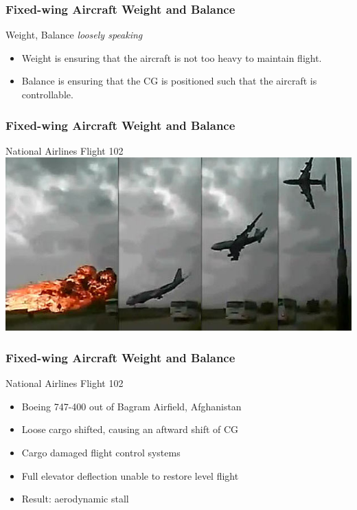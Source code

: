 \begin{frame}
\frametitle{Fixed-wing Aircraft Weight and Balance}
\begin{block}{Weight, Balance \emph{\tiny{loosely speaking}}}
\begin{itemize}
\item Weight is ensuring that the aircraft is not too heavy to maintain flight.
\item Balance is ensuring that the CG is positioned such that the aircraft is controllable.
\end{itemize}
\end{block}
\end{frame}

\begin{frame}
\frametitle{Fixed-wing Aircraft Weight and Balance}
\begin{block}{National Airlines Flight 102}
\includegraphics[height=0.5\textheight]{image/bagram-102.jpg}
\end{block}
\end{frame}

\begin{frame}
\frametitle{Fixed-wing Aircraft Weight and Balance}
\begin{block}{National Airlines Flight 102}
\begin{itemize}
\item<1-> Boeing 747-400 out of Bagram Airfield, Afghanistan
\item<2-> Loose cargo shifted, causing an aftward shift of CG
\item<3-> Cargo damaged flight control systems
\item<4-> Full elevator deflection unable to restore level flight
\item<5-> Result: aerodynamic stall
\end{itemize}
\end{block}
\end{frame}

